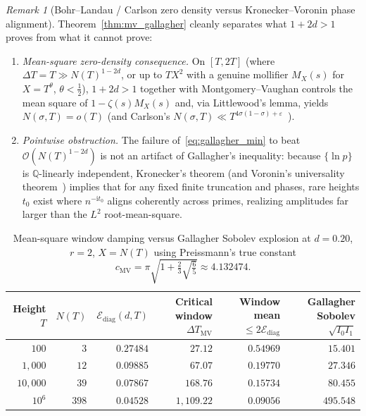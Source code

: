 \documentclass[11pt,reqno]{amsart}
\theoremstyle{definition}
\theoremstyle{remark}
\newtheorem{remark}[theorem]{Remark}
\numberwithin{equation}{section}
\newcommand{\ii}{\mathrm{i}}
\begin{document}
\begin{remark}[Bohr--Landau / Carlson zero density versus Kronecker--Voronin phase alignment]\label{rem:bohr_landau}
Theorem~\ref{thm:mv_gallagher} cleanly separates what $1 + 2d > 1$ proves from what it cannot prove:
\begin{enumerate}[label=\textup{(\alph*)},leftmargin=2.0em]
\item \textit{Mean-square zero-density consequence.} On $[T, 2T]$ (where $\Delta T = T \gg N(T)^{1-2d}$, or up to $T X^2$ with a genuine mollifier $M_X(s)$ for $X = T^\theta$, $\theta < \frac{1}{2}$), $1 + 2d > 1$ together with Montgomery--Vaughan controls the mean square of $1 - \zeta(s)M_X(s)$ and, via Littlewood's lemma, yields $N(\sigma, T) = o(T)$ (and Carlson's $N(\sigma, T) \ll T^{4\sigma(1-\sigma)+\varepsilon}$~\cite{bohrlandau1914,carlson1920,titchmarsh1986,hinkkanen1997}).
\item \textit{Pointwise obstruction.} The failure of~\eqref{eq:gallagher_min} to beat $\mathcal{O}(N(T)^{1-2d})$ is not an artifact of Gallagher's inequality: because $\{\ln p\}$ is $\mathbb{Q}$-linearly independent, Kronecker's theorem (and Voronin's universality theorem~\cite{voronin1975}) implies that for any fixed finite truncation and phases, rare heights $t_0$ exist where $n^{-\ii t_0}$ aligns coherently across primes, realizing amplitudes far larger than the $L^2$ root-mean-square.
\end{enumerate}
\end{remark}

\begin{table}[t]
\centering
\caption{Mean-square window damping versus Gallagher Sobolev explosion at $d = 0.20$, $r = 2$, $X = N(T)$ using Preissmann's true constant $c_{\mathrm{MV}} = \pi\sqrt{1 + \frac{2}{3}\sqrt{\frac{6}{5}}} \approx 4.132474$.}\label{tab:mv_gallagher}
\footnotesize
\setlength{\tabcolsep}{5.0pt}
\begin{tabular}{@{}rrrrrr@{}}
\toprule
Height $T$ & $N(T)$ & $\mathcal{E}_{\mathrm{diag}}(d,T)$ & Critical window $\Delta T_{\mathrm{MV}}$ & Window mean $\le 2\mathcal{E}_{\mathrm{diag}}$ & Gallagher Sobolev $\sqrt{I_0 I_1}$ \\
\midrule
$100$       & $3$   & $0.27484$ & $27.12$    & $0.54969$ & $15.401$  \\
$1{,}000$   & $12$  & $0.09885$ & $67.07$    & $0.19770$ & $27.346$  \\
$10{,}000$  & $39$  & $0.07867$ & $168.76$   & $0.15734$ & $80.455$  \\
$10^6$      & $398$ & $0.04528$ & $1{,}109.22$ & $0.09056$ & $495.548$ \\
\bottomrule
\end{tabular}
\end{table}
\end{document}
